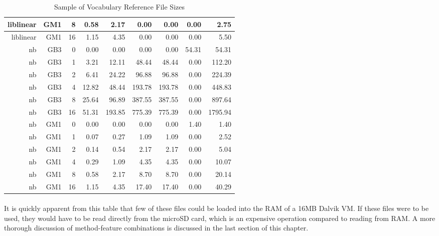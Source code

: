 \begin{table}[htbp!]
\begin{center}
\begin{tabular}{ | r | r | r | r | r | r | r | r | r | }
			liblinear & GM1 & 8 & 0.58 & 2.17 & 0.00 & 0.00 & 0.00 & 2.75\\ \hline 
			liblinear & GM1 & 16 & 1.15 & 4.35 & 0.00 & 0.00 & 0.00 & 5.50\\ \hline 
			nb & GB3 & 0 & 0.00 & 0.00 & 0.00 & 0.00 & 54.31 & 54.31\\ \hline 
			nb & GB3 & 1 & 3.21 & 12.11 & 48.44 & 48.44 & 0.00 & 112.20\\ \hline 
			nb & GB3 & 2 & 6.41 & 24.22 & 96.88 & 96.88 & 0.00 & 224.39\\ \hline 
			nb & GB3 & 4 & 12.82 & 48.44 & 193.78 & 193.78 & 0.00 & 448.83\\ \hline 
			nb & GB3 & 8 & 25.64 & 96.89 & 387.55 & 387.55 & 0.00 & 897.64\\ \hline 
			nb & GB3 & 16 & 51.31 & 193.85 & 775.39 & 775.39 & 0.00 & 1795.94\\ \hline 
			nb & GM1 & 0 & 0.00 & 0.00 & 0.00 & 0.00 & 1.40 & 1.40\\ \hline 
			nb & GM1 & 1 & 0.07 & 0.27 & 1.09 & 1.09 & 0.00 & 2.52\\ \hline 
			nb & GM1 & 2 & 0.14 & 0.54 & 2.17 & 2.17 & 0.00 & 5.04\\ \hline 
			nb & GM1 & 4 & 0.29 & 1.09 & 4.35 & 4.35 & 0.00 & 10.07\\ \hline 
			nb & GM1 & 8 & 0.58 & 2.17 & 8.70 & 8.70 & 0.00 & 20.14\\ \hline 
			nb & GM1 & 16 & 1.15 & 4.35 & 17.40 & 17.40 & 0.00 & 40.29\\ \hline
		\end{tabular}
		\caption{Sample of Vocabulary Reference File Sizes}
		\label{tab:sample_vocab_reference_sizes}
		\end{center}
	\end{table}
	

	\paragraph*{} It is quickly apparent from this table that few of these files could be loaded into the RAM of a 16MB Dalvik VM.  If these files were to be used, they would have to be read directly from the microSD card, which is an expensive operation compared to reading from RAM.  A more thorough discussion of method-feature combinations is discussed in the last section of this chapter.
	
